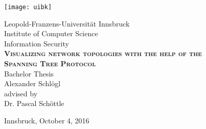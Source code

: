 \begin{titlepage}

    \begin{center}

        \texttt{[image: uibk]}

        \large Leopold-Franzens-Universit\"at Innsbruck\\
        [0.5cm]  

        \large Institute of Computer Science\\Information Security\\
        [3cm]

        \textsc{\large\textbf{Visualizing network topologies with the help of the\\
        Spanning Tree Protocol}}\\
        Bachelor Thesis\\
        [2cm]

        Alexander Schlögl\\
        [3.5cm]

        advised by\\
        Dr. Pascal Schöttle\\

        \vfill

        Innsbruck, October 4, 2016

    \end{center}

\end{titlepage}


